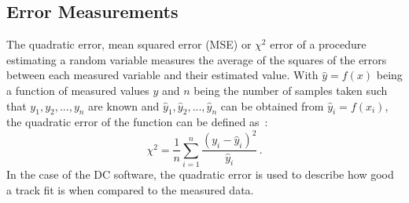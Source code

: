 \subsection{Error Measurements} \label{add:errors}
The quadratic error, mean squared error (MSE) or $\chi^2$ error of a procedure estimating a random variable measures the average of the squares of the errors between each measured variable and their estimated value.
With $\hat{y} = f(x)$ being a function of measured values $y$ and $n$ being the number of samples taken such that ${y_1, y_2, ..., y_n}$ are known and ${\hat{y}_1, \hat{y}_2, ..., \hat{y}_n}$ can be obtained from $\hat{y}_i = f(x_i)$, the quadratic error of the function can be defined as~\cite{taylor1997introduction}:
    \begin{equation*}
        \chi^2 = \frac{1}{n} \sum\limits_{i=1}^n \frac{(y_i - \hat{y}_i)^2}{\hat{y}_i}\,.
    \end{equation*}
In the case of the DC software, the quadratic error is used to describe how good a track fit is when compared to the measured data.
